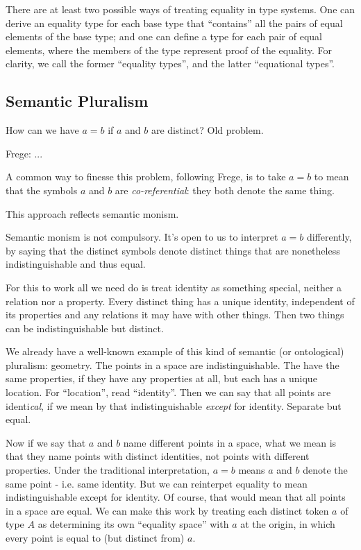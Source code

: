 There are at least two possible ways of treating equality in type
systems. One can derive an equality type for each base type that
``contains'' all the pairs of equal elements of the base type; and one
can define a type for each pair of equal elements, where the members
of the type represent proof of the equality. For clarity, we call the
former ``equality types'', and the latter ``equational types''.

\subsection{Semantic Pluralism}

How can we have \(a=b\) if \(a\) and \(b\) are distinct?  Old problem.

Frege: ...

A common way to finesse this problem, following Frege, is to take
\(a=b\) to mean that the symbols \(a\) and \(b\) are
\textit{co-referential}: they both denote the same thing.

This approach reflects semantic monism.

Semantic monism is not compulsory. It's open to us to interpret
\(a=b\) differently, by saying that the distinct symbols denote
distinct things that are nonetheless indistinguishable and thus equal.

For this to work all we need do is treat identity as something
special, neither a relation nor a property. Every distinct thing has a
unique identity, independent of its properties and any relations it
may have with other things. Then two things can be indistinguishable
but distinct.

We already have a well-known example of this kind of semantic (or
ontological) pluralism: geometry. The points in a space are
indistinguishable. The have the same properties, if they have any
properties at all, but each has a unique location. For ``location'',
read ``identity''. Then we can say that all points are
identi\textit{cal}, if we mean by that indistinguishable
\textit{except} for identity.  Separate but equal.

Now if we say that \(a\) and \(b\) name different points in a space,
what we mean is that they name points with distinct identities, not
points with different properties. Under the traditional
interpretation, \(a=b\) means \(a\) and \(b\) denote the same point -
i.e. same identity. But we can reinterpet equality to mean
indistinguishable except for identity. Of course, that would mean that
all points in a space are equal. We can make this work by treating
each distinct token \(a\) of type \(A\) as determining its own
``equality space'' with \(a\) at the origin, in which every point is
equal to (but distinct from) \(a\).

